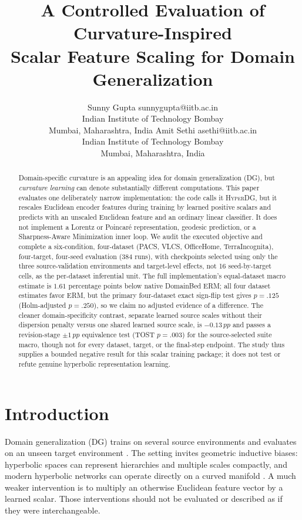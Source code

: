 \documentclass[10pt]{article}
\title{A Controlled Evaluation of Curvature-Inspired\\
Scalar Feature Scaling for Domain Generalization}
\author{%
\name Sunny Gupta \email sunnygupta@iitb.ac.in\\
\addr Indian Institute of Technology Bombay\\
Mumbai, Maharashtra, India
\AND
\name Amit Sethi \email asethi@iitb.ac.in\\
\addr Indian Institute of Technology Bombay\\
Mumbai, Maharashtra, India
}
\newcommand{\method}{\textsc{HyperDG}}
\newcommand{\pp}{\,pp}
\begin{document}
\maketitle
{}

\begin{abstract}
Domain-specific curvature is an appealing idea for domain generalization (DG),
but \emph{curvature learning} can denote substantially different computations.
This paper evaluates one deliberately narrow implementation: the code calls it
\method{}, but it rescales Euclidean encoder features during training by
learned positive scalars and predicts with an unscaled Euclidean feature and
an ordinary linear classifier. It does not implement a Lorentz or
Poincar\'e representation, geodesic prediction, or a Sharpness-Aware
Minimization inner loop. We audit the executed objective and complete a
six-condition, four-dataset (PACS, VLCS, OfficeHome, TerraIncognita),
four-target, four-seed evaluation (384 runs), with checkpoints selected using
only the three source-validation environments and target-level effects, not
16 seed-by-target cells, as the per-dataset inferential unit. The full
implementation's equal-dataset macro estimate is $1.61$ percentage points
below native DomainBed ERM; all four dataset estimates favor ERM, but the
primary four-dataset exact sign-flip test gives $p=.125$ (Holm-adjusted
$p=.250$), so we claim no adjusted evidence of a difference. The cleaner
domain-specificity contrast, separate learned source scales without their
dispersion penalty versus one shared learned source scale, is $-0.13\pp$ and
passes a revision-stage $\pm1\pp$ equivalence test (TOST $p=.003$) for the
source-selected suite macro, though not for every dataset, target, or the
final-step endpoint. The study thus supplies a bounded negative result for
this scalar training package; it does not test or refute genuine hyperbolic
representation learning.
\end{abstract}

\section{Introduction}
\label{sec:introduction}

Domain generalization (DG) trains on several source environments and evaluates
on an unseen target environment \citep{wang2022generalizing,gulrajani2021insearch}.
The setting invites geometric inductive biases: hyperbolic spaces can represent
hierarchies and multiple scales compactly, and modern hyperbolic networks can
operate directly on a curved manifold \citep{ganea2018hyperbolic,
fan2025curvaturelearning}. A much weaker intervention is to multiply an
otherwise Euclidean feature vector by a learned scalar. Those interventions
should not be evaluated or described as if they were interchangeable.
\end{document}
